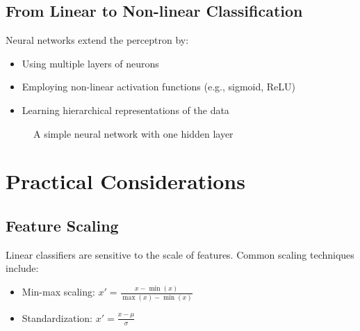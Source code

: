 \documentclass{article}
\begin{document}
\subsection{From Linear to Non-linear Classification}
Neural networks extend the perceptron by:
\begin{itemize}
    \item Using multiple layers of neurons
    \item Employing non-linear activation functions (e.g., sigmoid, ReLU)
    \item Learning hierarchical representations of the data
\end{itemize}

\begin{figure}[h]
\centering
{}
\caption{A simple neural network with one hidden layer}
\end{figure}

\section{Practical Considerations}

\subsection{Feature Scaling}
Linear classifiers are sensitive to the scale of features. Common scaling techniques include:
\begin{itemize}
    \item Min-max scaling: $x' = \frac{x - \min(x)}{\max(x) - \min(x)}$
    \item Standardization: $x' = \frac{x - \mu}{\sigma}$
\end{itemize}
\end{document}
